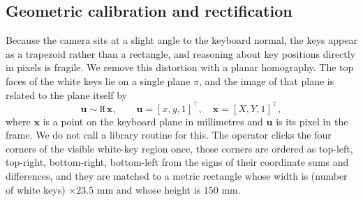 \documentclass[11pt]{article}
\begin{document}
\begin{center}
\label{fig:pipeline}
\end{center}

\subsection{Geometric calibration and rectification}
\label{sec:rectify}
Because the camera sits at a slight angle to the keyboard normal, the keys appear
as a trapezoid rather than a rectangle, and reasoning about key positions
directly in pixels is fragile. We remove this distortion with a planar
homography. The top faces of the white keys lie on a single plane $\pi$, and the
image of that plane is related to the plane itself by
\begin{equation}
  \mathbf{u} \sim \mathtt{H}\,\mathbf{x}, \qquad
  \mathbf{u}=[x,y,1]^{\top}, \quad \mathbf{x}=[X,Y,1]^{\top},
\end{equation}
where $\mathbf{x}$ is a point on the keyboard plane in millimetres and
$\mathbf{u}$ is its pixel in the frame. We do not call a library routine for
this. The operator clicks the four corners of the visible white-key region once,
those corners are ordered as top-left, top-right, bottom-right, bottom-left from
the signs of their coordinate sums and differences, and they are matched to a
metric rectangle whose width is (number of white keys) $\times 23.5$ mm and whose
height is $150$ mm.
\end{document}
